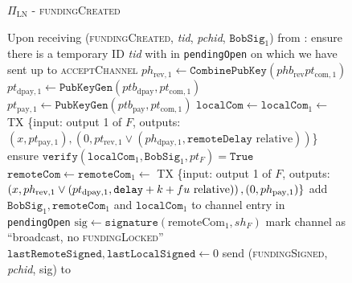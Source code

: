   \begin{figure}[H]
    \begin{protocolbox}{$\Pi_{\mathrm{LN}}$ - \textsc{fundingCreated}}
      \begin{algorithmic}[1]
        \State Upon receiving (\textsc{fundingCreated}, \textit{tid},
        \textit{pchid}, $\mathtt{BobSig}_1$) from \bob:
        \Indent
          \State ensure there is a temporary ID \textit{tid} with \bob{} in
          \texttt{pendingOpen} on which we have sent up to
          \textsc{acceptChannel}
          \State $ph_{\mathrm{rev}, 1} \gets
          \mathtt{CombinePubKey}\left(phb_{\mathrm{rev}} pt_{\mathrm{com},
          1}\right)$
          \State $pt_{\mathrm{dpay}, 1} \gets
          \texttt{PubKeyGen}\left(ptb_{\mathrm{dpay}}, pt_{\mathrm{com},
          1}\right)$
          \State $pt_{\mathrm{pay}, 1} \gets
          \texttt{PubKeyGen}\left(ptb_{\mathrm{pay}}, pt_{\mathrm{com},
          1}\right)$
          \State $\mathtt{localCom} \gets \mathtt{localCom}_1 \gets$ TX \{input:
          output 1 of $F$, outputs: $\left(x, pt_{\mathrm{pay}, 1}\right),
          \left(0, pt_{\mathrm{rev}, 1} \vee \left(ph_{\mathrm{dpay}, 1},
          \mathtt{remoteDelay} \text{ relative}\right)\right)$\}
          \State ensure $\mathtt{verify}\left(\mathtt{localCom}_1,
          \mathtt{BobSig}_1, pt_F\right) = \mathtt{True}$
          \State $\mathtt{remoteCom} \gets \mathtt{remoteCom}_1 \gets$ TX
          \{input: output 1 of $F$, outputs: $\left(x, ph_{\mathrm{rev}, 1} \vee
          \left(pt_{\mathrm{dpay}, 1}, \mathtt{delay} + k + fu{} \text{
          relative}\right)\right), \left(0, ph_{\mathrm{pay}, 1}\right)\}$
          \State add $\mathtt{BobSig}_1, \mathtt{remoteCom}_1$ and
          $\mathtt{localCom}_1$ to channel entry in \texttt{pendingOpen}
          \State $\mathrm{sig} \gets
          \mathtt{signature}\left(\mathrm{remoteCom}_1, sh_F\right)$
          \State mark channel as ``broadcast, no \textsc{fundingLocked}''
          \label{alg:protocol:open:fundingCreated:mark}
          \State $\mathtt{lastRemoteSigned}, \mathtt{lastLocalSigned} \gets 0$
          \State send (\textsc{fundingSigned}, \textit{pchid}, sig) to \bob{}
        \EndIndent
      \end{algorithmic}
    \end{protocolbox}
    \caption{}
    \label{alg:protocol:open:fundingCreated}
  \end{figure}

